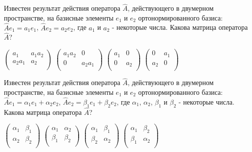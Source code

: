 \documentclass[11pt,a4paper]{exam}
\begin{document}
\begin{questions}
\question Известен результат действия оператора $\hat{A}$, действующего в двумерном пространстве, на базисные элементы ${{e}_{1}}$ и ${{e}_{2}}$ ортонормированного базиса: $\hat{A}{{e}_{1}}={{a}_{1}}{{e}_{1}}$, $\hat{A}{{e}_{2}}={{a}_{2}}{{e}_{2}}$, где ${{a}_{1}}$ и ${{a}_{2}}$ - некоторые числа. Какова матрица оператора $\hat{A}$?
\begin{choices}
\choice $\left( \begin{matrix}
   {{a}_{1}} & {{a}_{1}}{{a}_{2}}  \\
   {{a}_{2}}{{a}_{1}} & {{a}_{2}}  \\
\end{matrix} \right)$      
\choice $\left( \begin{matrix}
   {{a}_{1}}{{a}_{2}} & 0  \\
   0 & {{a}_{2}}{{a}_{1}}  \\
\end{matrix} \right)$      
\choice $\left( \begin{matrix}
   {{a}_{1}} & 0  \\
   0 & {{a}_{2}}  \\
\end{matrix} \right)$      
\choice $\left( \begin{matrix}
   0 & {{a}_{1}}  \\
   {{a}_{2}} & 0  \\
\end{matrix} \right)$
\end{choices}

\question Известен результат действия оператора $\hat{A}$, действующего в двумерном пространстве, на базисные элементы ${{e}_{1}}$ и ${{e}_{2}}$ ортонормированного базиса: $\hat{A}{{e}_{1}}={{\alpha }_{1}}{{e}_{1}}+{{\alpha }_{2}}{{e}_{2}}$, $\hat{A}{{e}_{2}}={{\beta }_{1}}{{e}_{1}}+{{\beta }_{2}}{{e}_{2}}$, где ${{\alpha }_{1}}$, ${{\alpha }_{2}}$, ${{\beta }_{1}}$ и ${{\beta }_{2}}$ - некоторые числа. Какова матрица оператора $\hat{A}$?
\begin{choices}
\choice $\left( \begin{matrix}
   {{\alpha }_{1}} & {{\beta }_{1}}  \\
   {{\alpha }_{2}} & {{\beta }_{2}}  \\
\end{matrix} \right)$      
\choice $\left( \begin{matrix}
   {{\alpha }_{1}} & {{\alpha }_{2}}  \\
   {{\beta }_{1}} & {{\beta }_{2}}  \\
\end{matrix} \right)$      
\choice $\left( \begin{matrix}
   {{\alpha }_{1}} & {{\beta }_{1}}  \\
   {{\beta }_{2}} & {{\alpha }_{2}}  \\
\end{matrix} \right)$      
\choice $\left( \begin{matrix}
   {{\alpha }_{1}} & {{\beta }_{2}}  \\
   {{\beta }_{1}} & {{\alpha }_{2}}  \\
\end{matrix} \right)$
\end{choices}


\end{questions}
\end{document}
